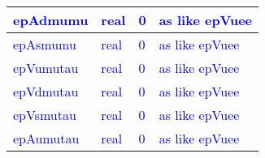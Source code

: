 \documentclass{article}
\begin{document}
\begin{longtable}{llll}
\midrule
\textcolor{blue}{epAdmumu} & \begin{minipage}[t]{2cm}\textcolor{blue}{real}\end{minipage} & \begin{minipage}[t]{2cm}\textcolor{blue}{0}\end{minipage} & \begin{minipage}[t]{12cm}\textcolor{blue}{as like epVuee}\end{minipage}\\*
\midrule
\textcolor{blue}{epAsmumu} & \begin{minipage}[t]{2cm}\textcolor{blue}{real}\end{minipage} & \begin{minipage}[t]{2cm}\textcolor{blue}{0}\end{minipage} & \begin{minipage}[t]{12cm}\textcolor{blue}{as like epVuee}\end{minipage}\\*
\midrule
\textcolor{blue}{epVumutau} & \begin{minipage}[t]{2cm}\textcolor{blue}{real}\end{minipage} & \begin{minipage}[t]{2cm}\textcolor{blue}{0}\end{minipage} & \begin{minipage}[t]{12cm}\textcolor{blue}{as like epVuee}\end{minipage}\\*
\midrule
\textcolor{blue}{epVdmutau} & \begin{minipage}[t]{2cm}\textcolor{blue}{real}\end{minipage} & \begin{minipage}[t]{2cm}\textcolor{blue}{0}\end{minipage} & \begin{minipage}[t]{12cm}\textcolor{blue}{as like epVuee}\end{minipage}\\*
\midrule
\textcolor{blue}{epVsmutau} & \begin{minipage}[t]{2cm}\textcolor{blue}{real}\end{minipage} & \begin{minipage}[t]{2cm}\textcolor{blue}{0}\end{minipage} & \begin{minipage}[t]{12cm}\textcolor{blue}{as like epVuee}\end{minipage}\\*
\midrule
\textcolor{blue}{epAumutau} & \begin{minipage}[t]{2cm}\textcolor{blue}{real}\end{minipage} & \begin{minipage}[t]{2cm}\textcolor{blue}{0}\end{minipage} & \begin{minipage}[t]{12cm}\textcolor{blue}{as like epVuee}\end{minipage}\\*

\end{longtable}
\end{document}
